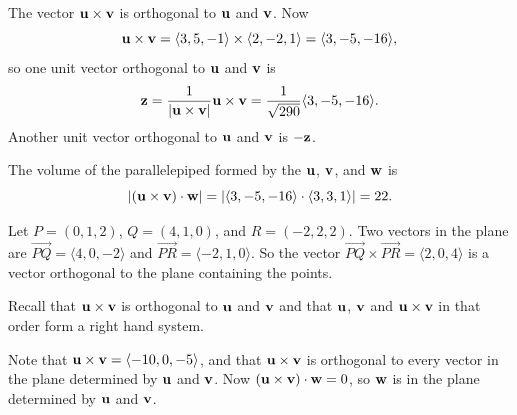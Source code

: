 \begin{activitySolution}
\ba
\item The vector $\mathbf{u} \times \mathbf{v}$ is orthogonal to $\mathbf{u}$ and $\mathbf{v}$. Now
\[\mathbf{u} \times \mathbf{v} = \langle 3, 5, -1\rangle \times \langle 2, -2, 1\rangle = \langle 3, -5, -16 \rangle,\]
so one unit vector orthogonal to $\mathbf{u}$ and $\mathbf{v}$ is 
\[\mathbf{z}=\frac{1}{|\mathbf{u} \times \mathbf{v}|} \mathbf{u} \times \mathbf{v} = \frac{1}{\sqrt{290}} \langle 3, -5, -16 \rangle.\]
Another unit vector orthogonal to $\mathbf{u}$ and $\mathbf{v}$ is $-\mathbf{z}$. 

\item The volume of the parallelepiped formed by the $\mathbf{u}$, $\mathbf{v}$, and $\mathbf{w}$ is
\[|(\mathbf{u} \times \mathbf{v})\cdot \mathbf{w}| = |\langle 3, -5, -16 \rangle \cdot \langle 3,3,1\rangle| = 22.\]

\item Let $P=(0,1,2)$, $Q=(4,1,0)$, and $R=(-2,2,2)$. Two vectors in the plane are $\overrightarrow{PQ} = \langle 4,0,-2 \rangle$ and $\overrightarrow{PR} = \langle -2,1,0 \rangle$. So the vector $\overrightarrow{PQ} \times \overrightarrow{PR} = \langle 2, 0, 4\rangle$ is a vector orthogonal to the plane containing the points.

\item Recall that $\mathbf{u} \times \mathbf{v}$ is orthogonal to $\mathbf{u}$ and $\mathbf{v}$ and that $\mathbf{u}$, $\mathbf{v}$ and $\mathbf{u} \times \mathbf{v}$ in that order form a right hand system. 

\item Note that $\mathbf{u} \times \mathbf{v} = \langle -10, 0, -5 \rangle$, and that $\mathbf{u} \times \mathbf{v}$ is orthogonal to every vector in the plane determined by $\mathbf{u}$ and $\mathbf{v}$. Now $(\mathbf{u} \times \mathbf{v}) \cdot \mathbf{w} = 0$, so $\mathbf{w}$ is in the plane determined by $\mathbf{u}$ and $\mathbf{v}$.  

\ea
\end{activitySolution}
\aftera
